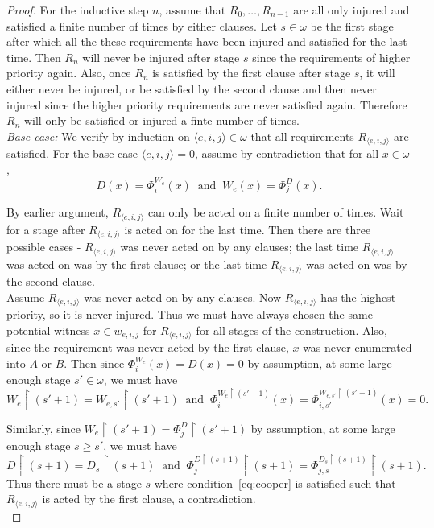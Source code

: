 \documentclass{article}
\begin{document}
\begin{proof}
    For the inductive step $n$, assume that $R_0,\ldots,R_{n-1}$ are all
    only injured and satisfied a finite number of times by either clauses.
    Let $s\in\omega$ be the first stage after which all the these
    requirements have been injured and satisfied for the last time. Then
    $R_n$ will never be injured after stage $s$ since the requirements of
    higher priority again. Also, once $R_n$ is satisfied by the first
    clause after stage $s$, it will either never be injured, or be
    satisfied by the second clause and then never injured since the higher
    priority requirements are never satisfied again. Therefore $R_n$ will
    only be satisfied or injured a finte number of times. \\

    \textit{Base case:} We verify by induction on $\langle
    e,i,j\rangle\in\omega$ that all requirements $R_{\langle e,i,j\rangle}$
    are satisfied. For the base case $\langle e,i,j\rangle=0$, assume by
    contradiction that for all $x\in\omega$,
    \[D(x)=\Phi_i^{W_e}(x)\;\; \text{and}\;\; W_e(x)=\Phi_j^D(x).\]

    By earlier argument, $R_{\langle e,i,j\rangle}$ can only be acted on a
    finite number of times. Wait for a stage after $R_{\langle
    e,i,j\rangle}$ is acted on for the last time. Then there are three
    possible cases - $R_{\langle e,i,j\rangle}$ was never acted on by any
    clauses; the last time $R_{\langle e,i,j\rangle}$ was acted on was by
    the first clause; or the last time $R_{\langle e,i,j\rangle}$ was acted
    on was by the second clause. \\

    Assume $R_{\langle e,i,j\rangle}$ was never acted on by any clauses.
    Now $R_{\langle e,i,j\rangle}$ has the highest priority, so it is never
    injured. Thus we must have always chosen the same potential witness
    $x\in w_{e,i,j}$ for $R_{\langle e,i,j\rangle}$ for all stages of the
    construction. Also, since the requirement was never acted by the first
    clause, $x$ was never enumerated into $A$ or $B$. Then since
    $\Phi_i^{W_e}(x)=D(x)=0$ by assumption, at some large enough stage
    $s'\in\omega$, we must have
    \[W_e\restriction (s'+1) =W_{e,s'}\restriction (s'+1)\;\;
    \text{and}\;\; \Phi_{i}^{W_{e} \restriction (s'+1)}(x)
    =\Phi_{i,s'}^{W_{e,s'} \restriction (s'+1)}(x)=0.\]

    Similarly, since $W_e\restriction(s'+1) =\Phi_j^D\restriction(s'+1)$ by
    assumption, at some large enough stage $s\geq s'$, we must have
    \[D\restriction(s+1) =D_{s}\restriction(s+1)\;\;
    \text{and}\;\; \Phi_{j}^{D\restriction(s+1)}
    \restriction(s+1) =\Phi_{j,s}^{D_{s}\restriction(s+1)}
    \restriction(s+1).\]
    Thus there must be a stage $s$ where condition~\eqref{eq:cooper} is
    satisfied such that $R_{\langle e,i,j\rangle}$ is acted by the first
    clause, a contradiction. \\


\end{proof}
\end{document}
